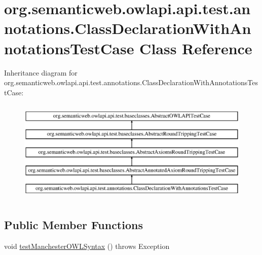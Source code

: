 \hypertarget{classorg_1_1semanticweb_1_1owlapi_1_1api_1_1test_1_1annotations_1_1_class_declaration_with_annotations_test_case}{\section{org.\-semanticweb.\-owlapi.\-api.\-test.\-annotations.\-Class\-Declaration\-With\-Annotations\-Test\-Case Class Reference}
\label{classorg_1_1semanticweb_1_1owlapi_1_1api_1_1test_1_1annotations_1_1_class_declaration_with_annotations_test_case}
}
Inheritance diagram for org.\-semanticweb.\-owlapi.\-api.\-test.\-annotations.\-Class\-Declaration\-With\-Annotations\-Test\-Case\-:\begin{figure}[H]
\begin{center}
\leavevmode
\includegraphics[height=5.000000cm]{classorg_1_1semanticweb_1_1owlapi_1_1api_1_1test_1_1annotations_1_1_class_declaration_with_annotations_test_case}
\end{center}
\end{figure}
\subsection*{Public Member Functions}
\begin{DoxyCompactItemize}
\item 
void \hyperlink{classorg_1_1semanticweb_1_1owlapi_1_1api_1_1test_1_1annotations_1_1_class_declaration_with_annotations_test_case_a6452e08601e737964109a7422f26f941}{test\-Manchester\-O\-W\-L\-Syntax} ()  throws Exception 
\end{DoxyCompactItemize}
